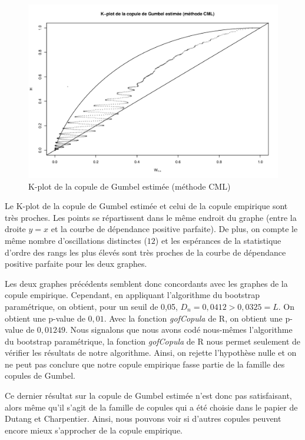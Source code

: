 \noindent%
\begin{figure}[H]
    \begin{center}
      \includegraphics[width=17 cm, angle=0]{./pictures/gumbelcmlkplot.png}
      \centering\caption{\label{2}K-plot de la copule de Gumbel estimée (méthode CML)}
    \end{center}
\end{figure}

Le K-plot de la copule de Gumbel estimée et celui de la copule empirique sont très proches. Les points se répartissent dans le même endroit du graphe (entre la droite $y=x$ et la courbe de dépendance positive parfaite). De plus, on compte le même nombre d'oscillations distinctes ($12$) et les espérances de la statistique d'ordre des rangs les plus élevés sont très proches de la courbe de dépendance positive parfaite pour les deux graphes. 

Les deux graphes précédents semblent donc concordants avec les graphes de la copule empirique.
Cependant, en appliquant l'algorithme du bootstrap paramétrique, on obtient, pour un seuil de 0,05, $D_n = 0,0412 > 0,0325 = L$. On obtient une p-value de $0,01$. Avec la fonction \textit{gofCopula} de R, on obtient une p-value de $0,01249$. 
Nous signalons que nous avons codé nous-mêmes l'algorithme du bootstrap paramétrique, la fonction \textit{gofCopula} de R nous permet seulement de vérifier les résultats de notre algorithme.
Ainsi, on rejette l'hypothèse nulle et on ne peut pas conclure que notre copule empirique fasse partie de la famille des copules de Gumbel.

Ce dernier résultat sur la copule de Gumbel estimée n'est donc pas satisfaisant, alors même qu'il s'agit de la famille de copules qui a été choisie dans le papier de Dutang et Charpentier. Ainsi, nous pouvons voir si d'autres copules peuvent encore mieux s'approcher de la copule empirique.

